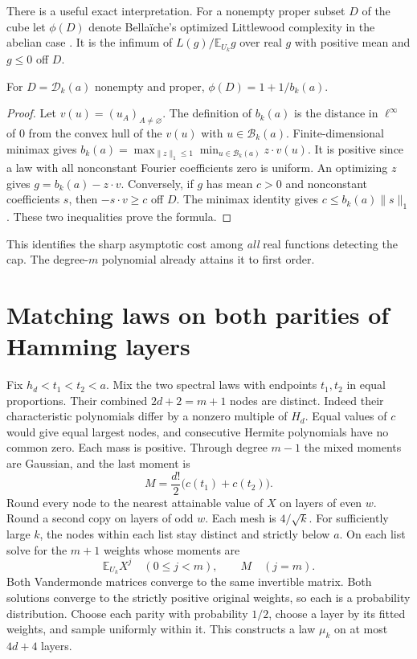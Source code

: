 \documentclass[11pt,letterpaper]{article}
\theoremstyle{research}
\newcommand{\E}{\mathbb E}\newcommand{\R}{\mathbb R}\newcommand{\N}{\mathbb N}
\newcommand{\U}{U_k}\newcommand{\He}{H}
\newcommand{\low}{\mathcal B_k(a)}\newcommand{\high}{\mathcal D_k(a)}
\newcommand{\sect}[1]{\section{\texorpdfstring{\color{ink}#1}{#1}}}
\begin{document}
There is a useful exact interpretation. For a nonempty proper subset $D$
of the cube let $\phi(D)$ denote Bella\"iche's optimized Littlewood
complexity in the abelian case \cite{bellaiche}. It is the infimum of
$L(g)/\E_{\U}g$ over real $g$ with positive mean and $g\le0$ off $D$.
\begin{proposition}\label{prop:dual}
For $D=\high$ nonempty and proper, $\phi(D)=1+1/b_k(a)$.
\end{proposition}
\begin{proof}
Let $v(u)=(u_A)_{A\ne\varnothing}$. The definition of $b_k(a)$ is the
distance in $\ell^\infty$ of $0$ from the convex hull of the $v(u)$
with $u\in\low$. Finite-dimensional minimax gives
$b_k(a)=\max_{\|z\|_1\le1}\min_{u\in\low}z\cdot v(u)$.
It is positive since a law with all nonconstant Fourier coefficients zero
is uniform. An optimizing $z$ gives $g=b_k(a)-z\cdot v$.
Conversely, if $g$ has mean $c>0$ and nonconstant coefficients $s$,
then $-s\cdot v\ge c$ off $D$. The minimax identity gives
$c\le b_k(a)\|s\|_1$. These two inequalities prove the formula.
\end{proof}
This identifies the sharp asymptotic cost among \emph{all} real functions
detecting the cap. The degree-$m$ polynomial already attains it to first order.
\clearpage
\sect{Matching laws on both parities of Hamming layers}
Fix $h_d<t_1<t_2<a$. Mix the two spectral laws with endpoints $t_1,t_2$
in equal proportions. Their combined $2d+2=m+1$ nodes are distinct.
Indeed their characteristic polynomials differ by a nonzero multiple of
$H_d$. Equal values of $c$ would give equal largest nodes, and consecutive
Hermite polynomials have no common zero. Each mass is positive. Through degree
$m-1$ the mixed moments are Gaussian, and the last moment is
\[
                 M=\frac{d!}{2}\big(c(t_1)+c(t_2)\big).
\]
Round every node to the nearest attainable value of $X$ on layers of even
$w$. Round a second copy on layers of odd $w$. Each mesh is $4/\sqrt k$.
For sufficiently large $k$, the nodes within each list stay distinct and
strictly below $a$. On each list solve for the $m+1$ weights whose moments are
\begin{equation}\label{eq:momenttarget}
       \E_{\U}X^j\quad(0\le j<m),\qquad M\quad(j=m).
\end{equation}
Both Vandermonde matrices converge to the same invertible matrix. Both
solutions converge to the strictly positive original weights, so each is
a probability distribution. Choose each parity with probability $1/2$,
choose a layer by its fitted weights, and sample uniformly within it.
This constructs a law $\mu_k$ on at most $4d+4$ layers.
\end{document}
